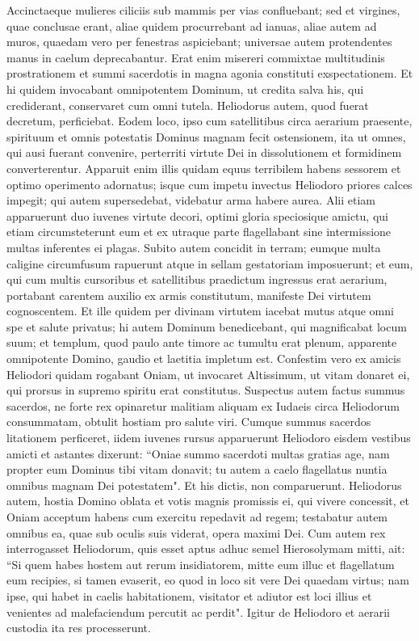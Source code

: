 \begin{biblechapter}
\verse Accinctaeque mulieres ciliciis sub mammis per vias confluebant; sed et virgines, quae conclusae erant, aliae quidem procurrebant ad ianuas, aliae autem ad muros, quaedam vero per fenestras aspiciebant; 
\verse universae autem protendentes manus in caelum deprecabantur. 
\verse Erat enim misereri commixtae multitudinis prostrationem et summi sacerdotis in magna agonia constituti exspectationem.  
\verse Et hi quidem invocabant omnipotentem Dominum, ut credita salva his, qui crediderant, conservaret cum omni tutela. 
\verse Heliodorus autem, quod fuerat decretum, perficiebat. 
\verse Eodem loco, ipso cum satellitibus circa aerarium praesente, spirituum et omnis potestatis Dominus magnam fecit ostensionem, ita ut omnes, qui ausi fuerant convenire, perterriti virtute Dei in dissolutionem et formidinem converterentur. 
\verse Apparuit enim illis quidam equus terribilem habens sessorem et optimo operimento adornatus; isque cum impetu invectus Heliodoro priores calces impegit; qui autem supersedebat, videbatur arma habere aurea. 
\verse Alii etiam apparuerunt duo iuvenes virtute decori, optimi gloria speciosique amictu, qui etiam circumsteterunt eum et ex utraque parte flagellabant sine intermissione multas inferentes ei plagas. 
\verse Subito autem concidit in terram; eumque multa caligine circumfusum rapuerunt atque in sellam gestatoriam imposuerunt; 
\verse et eum, qui cum multis cursoribus et satellitibus praedictum ingressus erat aerarium, portabant carentem auxilio ex armis constitutum, manifeste Dei virtutem cognoscentem.  
\verse Et ille quidem per divinam virtutem iacebat mutus atque omni spe et salute privatus; 
\verse hi autem Dominum benedicebant, qui magnificabat locum suum; et templum, quod paulo ante timore ac tumultu erat plenum, apparente omnipotente Domino, gaudio et laetitia impletum est. 
\verse Confestim vero ex amicis Heliodori quidam rogabant Oniam, ut invocaret Altissimum, ut vitam donaret ei, qui prorsus in supremo spiritu erat constitutus. 
\verse Suspectus autem factus summus sacerdos, ne forte rex opinaretur malitiam aliquam ex Iudaeis circa Heliodorum consummatam, obtulit hostiam pro salute viri. 
\verse Cumque summus sacerdos litationem perficeret, iidem iuvenes rursus apparuerunt Heliodoro eisdem vestibus amicti et astantes dixerunt: “Oniae summo sacerdoti multas gratias age, nam propter eum Dominus tibi vitam donavit; 
\verse tu autem a caelo flagellatus nuntia omnibus magnam Dei potestatem". Et his dictis, non comparuerunt. 
\verse Heliodorus autem, hostia Domino oblata et votis magnis promissis ei, qui vivere concessit, et Oniam acceptum habens cum exercitu repedavit ad regem;  
\verse testabatur autem omnibus ea, quae sub oculis suis viderat, opera maximi Dei.  
\verse Cum autem rex interrogasset Heliodorum, quis esset aptus adhuc semel Hierosolymam mitti, ait: 
\verse “Si quem habes hostem aut rerum insidiatorem, mitte eum illuc et flagellatum eum recipies, si tamen evaserit, eo quod in loco sit vere Dei quaedam virtus; 
\verse nam ipse, qui habet in caelis habitationem, visitator et adiutor est loci illius et venientes ad malefaciendum percutit ac perdit". 
\verse Igitur de Heliodoro et aerarii custodia ita res processerunt. 
\end{biblechapter}

